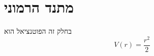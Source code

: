 \section{מתנד הרמוני}
בחלק זה הפוטנציאל הוא 
$$V(r) = \frac{r^2}{2}$$


\begin{figure}[h!]
    \centering
    
    \hfill
    
\end{figure}
